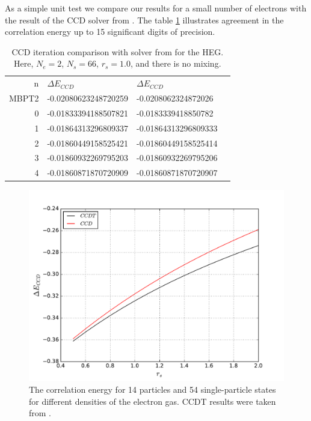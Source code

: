 \documentclass[twoside,english]{uiofysmaster}
\begin{document}
As a simple unit test we compare our results for a small number of electrons with the result of the CCD solver from \cite{Hjorth-Jensenadvancedcoursecomputational2017}. The table \ref{tab:unittest} illustrates agreement in the correlation energy up to 15 significant digits of precision.

\begin{table}[h]
\centering
\captionsetup{width=.8\textwidth}
\caption{CCD iteration comparison with solver from \cite{Hjorth-Jensenadvancedcoursecomputational2017} for the HEG. Here, $N_e=2$, $N_s=66$, $r_s=1.0$, and there is no mixing. }
        	\begin{tabular}{rlll}
        		n & $\Delta E_{CCD}$     & $\Delta E_{CCD}$ \cite{Hjorth-Jensenadvancedcoursecomputational2017} \\
        		MBPT2 & -0.02080623248720259 & -0.0208062324872026  \\
        		0 & -0.01833394188507821 & -0.0183339418850782  \\
        		1 & -0.01864313296809337 & -0.01864313296809333 \\
        		2 & -0.01860449158525421 & -0.01860449158525414 \\
        		3 & -0.01860932269795203 & -0.01860932269795206 \\
        		4 & -0.01860871870720909 & -0.01860871870720907 \\
\end{tabular}
\label{tab:unittest}
\end{table}
                              
\begin{figure}[ht!]
	\centering
	\includegraphics[width=0.8\linewidth]{CCDvsCCDT}
	\caption{The correlation energy for 14 particles and 54 single-particle states for different densities of the electron gas. CCDT results were taken from \cite{HansenCoupledclusterstudies}.}
	\label{fig:CCDvsCCDT}
\end{figure}
\end{document}
